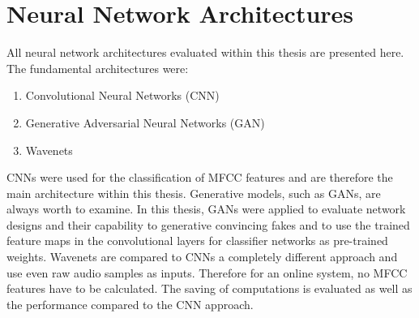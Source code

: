 
\section{Neural Network Architectures}\label{sec:nn_arch}
\thesisStateNotReady
All neural network architectures evaluated within this thesis are presented here.
The fundamental architectures were:
\begin{enumerate}
	\item Convolutional Neural Networks (CNN)
	\item Generative Adversarial Neural Networks (GAN)
	\item Wavenets
\end{enumerate}
CNNs were used for the classification of MFCC features and are therefore the main architecture within this thesis.
Generative models, such as GANs, are always worth to examine.
In this thesis, GANs were applied to evaluate network designs and their capability to generative convincing fakes and to use the trained feature maps in the convolutional layers for classifier networks as pre-trained weights.
Wavenets are compared to CNNs a completely different approach and use even raw audio samples as inputs.
Therefore for an online system, no MFCC features have to be calculated.
The saving of computations is evaluated as well as the performance compared to the CNN approach.


